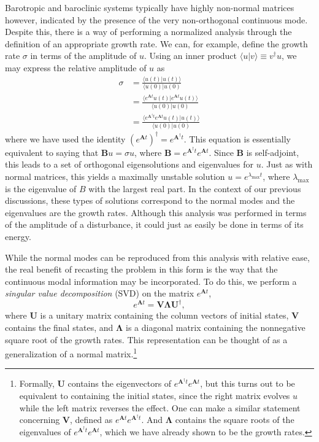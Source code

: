 \documentclass[letterpaper,11pt,onecolumn,twoside,titlepage]{article}
\begin{document}
Barotropic and baroclinic systems typically have highly non-normal matrices however, indicated by the presence of the very non-orthogonal continuous mode. Despite this, there is a way of performing a normalized analysis through the definition of an appropriate growth rate. We can, for example, define the growth rate $\sigma$ in terms of the amplitude of $u$. Using an inner product $\langle u | v \rangle \equiv v^\dag u$, we may express the relative amplitude of $u$ as
\[ \begin{split}
\sigma &= \frac{\langle u(t) | u(t) \rangle}{\langle u(0) | u(0)} \\
       &= \frac{\langle e^{\mathbf{A}t} u(t) | e^{\mathbf{A}t} u(t) \rangle}{\langle u(0) | u(0)} \\
       &= \frac{\langle e^{\mathbf{A}^\dag t} e^{\mathbf{A}t} u(t) | u(t) \rangle}{\langle u(0) | u(0)}
\end{split} \]
where we have used the identity $\left(e^{\mathbf{A} t}\right)^\dag = e^{\mathbf{A}^\dag t}$. This equation is essentially equivalent to saying that $\mathbf{B} u = \sigma u$, where $\mathbf{B} = e^{\mathbf{A}^\dag t} e^{\mathbf{A}t}$. Since $\mathbf{B}$ is self-adjoint, this leads to a set of orthogonal eigensolutions and eigenvalues for $u$. Just as with normal matrices, this yields a maximally unstable solution $u = e^{\lambda_\text{max} t}$, where $\lambda_\text{max}$ is the eigenvalue of $B$ with the largest real part. In the context of our previous discussions, these types of solutions correspond to the normal modes and the eigenvalues are the growth rates. Although this analysis was performed in terms of the amplitude of a disturbance, it could just as easily be done in terms of its energy.

While the normal modes can be reproduced from this analysis with relative ease, the real benefit of recasting the problem in this form is the way that the continuous modal information may be incorporated. To do this, we perform a \emph{singular value decomposition} (SVD) on the matrix $e^{\mathbf{A} t}$,
\[
e^{\mathbf{A}t} = \mathbf{V} \mathbf{\Lambda} \mathbf{U}^\dag,
\]
where $\mathbf{U}$ is a unitary matrix containing the column vectors of initial states, $\mathbf{V}$ contains the final states, and $\mathbf{\Lambda}$ is a diagonal matrix containing the nonnegative square root of the growth rates. This representation can be thought of as a generalization of a normal matrix.\footnote{Formally, $\mathbf{U}$ contains the eigenvectors of $e^{\mathbf{A}^\dag t} e^{\mathbf{A} t}$, but this turns out to be equivalent to containing the initial states, since the right matrix evolves $u$ while the left matrix reverses the effect. One can make a similar statement concerning $\mathbf{V}$, defined as $e^{\mathbf{A} t} e^{\mathbf{A}^\dag t}$. And $\mathbf{\Lambda}$ contains the square roots of the eigenvalues of $e^{\mathbf{A}^\dag t} e^{\mathbf{A} t}$, which we have already shown to be the growth rates.}
\end{document}
